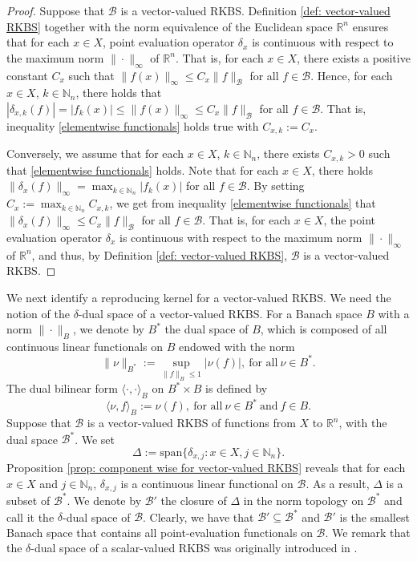\documentclass[11pt]{article}
\begin{document}
\begin{proof}
Suppose that $\mathcal{B}$ is a vector-valued RKBS. Definition \ref{def: vector-valued RKBS} together with the norm equivalence of the Euclidean space $\mathbb{R}^n$ ensures that for each  $x\in X$, point evaluation operator $\delta_x$ is continuous with respect to the maximum norm $\|\cdot\|_{\infty}$ of $\mathbb{R}^n$. That is, for each ${x}\in X$, there exists a positive constant $C_x$ such that $\|f(x)\|_{\infty}\leq C_{{x}}\|f\|_{\mathcal{B}}$ for all $f\in\mathcal{B}$. Hence, for each $x\in X$, $k\in\mathbb{N}_n$, there holds that $\left|\delta_{x,k}(f)\right|=|f_k(x)|\leq \|f(x)\|_{\infty}\leq C_x\|f\|_{\mathcal{B}}$ for all $f\in\mathcal{B}$. 
That is, inequality \eqref{elementwise functionals} holds true with $C_{{x},k}:=C_x$.

Conversely, we assume that for each ${x}\in X$, $k\in \mathbb{N}_n$, there exists $C_{{x},k}>0$ such that  \eqref{elementwise functionals} holds. Note that for each $x\in X$, there holds $\|\delta_x(f)\|_{\infty}=\max_{k\in\mathbb{N}_n}|f_k(x)|$ for all $f\in\mathcal{B}$. By setting $C_x:=\max_{k\in\mathbb{N}_n}C_{x,k}$, we get from inequality \eqref{elementwise functionals} that $\|\delta_x(f)\|_{\infty}\leq C_{x}\|f\|_{\mathcal{B}}$ for all $f\in\mathcal{B}$. That is, for each $x\in X$, the point evaluation operator $\delta_x$ is continuous with respect to the maximum norm $\|\cdot\|_{\infty}$ of $\mathbb{R}^n$, and thus, by Definition \ref{def: vector-valued RKBS}, $\mathcal{B}$ is a vector-valued RKBS.
\end{proof}

We next identify a reproducing kernel for a vector-valued RKBS. We need the notion of the $\delta$-dual space of a vector-valued RKBS.  For a Banach space $B$ with a norm $\|\cdot\|_{B}$, we denote by $B^*$ the dual space of $B$, which is composed of all continuous linear functionals on $B$ endowed with the norm 
$$
\|\nu\|_{B^*}:=\sup_{\|f\|_{B}\leq1}|\nu(f)|,\ \mbox{for all}\ \nu\in B^*.
$$
The dual bilinear form $\langle\cdot,\cdot\rangle_{B}$ on $B^*\times B$ is defined by 
$$
\langle\nu,f\rangle_{B}:=\nu(f),\ \mbox{for all}\ \nu\in B^* \  \mbox{and}\ f\in B.
$$
Suppose that $\mathcal{B}$ is a vector-valued RKBS of functions from $X$ to $\mathbb{R}^n$, with the dual space $\mathcal{B}^*$. We set 
\begin{equation}\label{Def:Delta}
    \Delta:=\mathrm{span}\{\delta_{x,j}:x\in X, j\in\mathbb{N}_n\}.
\end{equation}
Proposition \ref{prop: component wise for vector-valued RKBS} reveals that for each $x\in X$ and $j\in\mathbb{N}_n$, $\delta_{x,j}$ is a continuous linear functional on $\mathcal{B}$. As a result, $\Delta$ is a subset of $\mathcal{B}^*$. We denote by $\mathcal{B}'$ the closure of $\Delta$ in the norm topology on $\mathcal{B}^*$ and  call it the $\delta$-dual space of $\mathcal{B}$. Clearly, we have that $\mathcal{B}'\subseteq\mathcal{B}^*$ and $\mathcal{B}'$ is the smallest Banach space that contains all point-evaluation functionals on $\mathcal{B}$. We remark that the $\delta$-dual space of a scalar-valued RKBS was originally introduced in \cite{xu2022sparse}.
\end{document}
